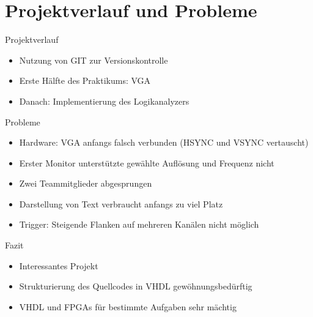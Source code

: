 \section{Projektverlauf und Probleme}
\begin{frame}[<+->]{Projektverlauf}
    \begin{itemize}
        \item Nutzung von GIT zur Versionskontrolle
        \item Erste Hälfte des Praktikums: VGA
        \item Danach: Implementierung des Logikanalyzers
    \end{itemize}
\end{frame}
\begin{frame}[<+->]{Probleme}
    \begin{itemize}
        \item Hardware: VGA anfangs falsch verbunden (HSYNC und VSYNC vertauscht)
        \item Erster Monitor unterstützte gewählte Auflösung und Frequenz nicht
        \item Zwei Teammitglieder abgesprungen
        \item Darstellung von Text verbraucht anfangs zu viel Platz
        \item Trigger: Steigende Flanken auf mehreren Kanälen nicht möglich
    \end{itemize}
\end{frame}
\begin{frame}[<+->]{Fazit}
    \begin{itemize}
        \item Interessantes Projekt
        \item Strukturierung des Quellcodes in VHDL gewöhnungsbedürftig
        \item VHDL und FPGAs für bestimmte Aufgaben sehr mächtig
    \end{itemize}
\end{frame}
